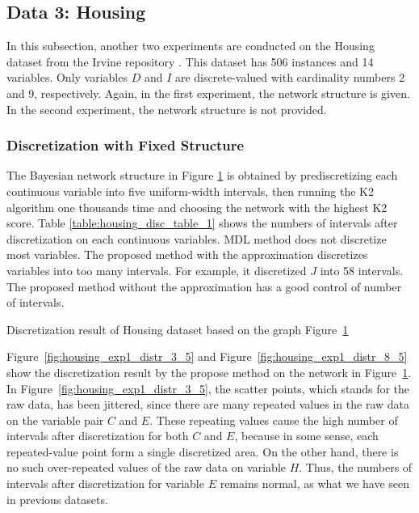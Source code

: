 \subsection{Data 3: Housing}
\label{subsec:housing}

In this subsection, another two experiments are conducted on the Housing dataset from the Irvine repository \citep{Lichman_2013}. This dataset has 506 instances and 14 variables. Only variables $D$ and $I$ are discrete-valued with cardinality numbers 2 and 9, respectively. Again, in the first experiment, the network structure is given. In the second experiment, the network structure is not provided.

\subsubsection{Discretization with Fixed Structure}
\label{subsubsec:housing_exp1}

The Bayesian network structure in Figure \ref{fig:housing_graph_1} is obtained by prediscretizing each continuous variable into five uniform-width intervals, then running the K2 algorithm one thousands time and choosing the network with the highest K2 score. Table \ref{table:housing_disc_table_1} shows the numbers of intervals after discretization on each continuous variables. MDL method does not discretize most variables. The proposed method with the approximation discretizes variables into too many intervals. For example, it discretized $J$ into 58 intervals. The proposed method without the approximation has a good control of number of intervals.
\begin{figure}[ht]
  \centering
    
  \caption{}
  \label{fig:housing_graph_1}
\end{figure}


\begin{table}
  \centering
  \scalebox{1.0}{
  
  }
  \caption{Discretization result of Housing dataset based on the graph Figure~\ref{fig:housing_graph_1} }
  \label{table:housing_disc_table_1}
\end{table}

Figure~\ref{fig:housing_exp1_distr_3_5} and Figure~\ref{fig:housing_exp1_distr_8_5} show the discretization result by the propose method on the network in Figure~\ref{fig:housing_graph_1}.
In Figure~\ref{fig:housing_exp1_distr_3_5}, the scatter points, which stands for the raw data, has been jittered, since there are many repeated values in the raw data on the variable pair $C$ and $E$. These repeating values cause the high number of intervals after discretization for both $C$ and $E$, because in some sense, each repeated-value point form a single discretized area. On the other hand, there is no such over-repeated values of the raw data on variable $H$. Thus, the numbers of intervals after discretization for variable $E$ remains normal, as what we have seen in previous datasets.

